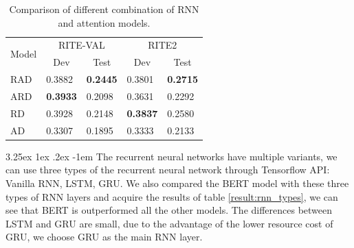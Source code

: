 \documentclass[12pt]{article}
\makeatletter
\renewcommand\paragraph{\@startsection{paragraph}{5}{\z@}%
  {3.25ex \@plus1ex \@minus.2ex}%
  {-1em}%
  {\normalfont\normalsize\bfseries}}
\makeatother
\begin{document}
\begin{CJK*}{UTF8}{bkai}
\begin{spacing}{1.77}
\begin{table}[H]
  \centering
  \setlength{\extrarowheight}{-3pt}
  \begin{tabular}{|l|l|l|l|l|}
  \hline
  \multicolumn{1}{|c|}{\multirow{2}{*}{Model}} & \multicolumn{2}{c|}{RITE-VAL} & \multicolumn{2}{c|}{RITE2} \\ \cline{2-5}
  \multicolumn{1}{|c|}{} & \multicolumn{1}{c|}{Dev} & \multicolumn{1}{c|}{Test} & \multicolumn{1}{c|}{Dev} & \multicolumn{1}{c|}{Test} \\ \hline
  RAD & 0.3882 & \textbf{0.2445} & 0.3801 & \textbf{0.2715} \\ \hline
  ARD & \textbf{0.3933} & 0.2098 & 0.3631 & 0.2292 \\ \hline
  RD & 0.3928 & 0.2148 & \textbf{0.3837} & 0.2580 \\ \hline
  AD & 0.3307 & 0.1895 & 0.3333 & 0.2133 \\ \hline
  \end{tabular}
  \caption{Comparison of different combination of RNN and attention models.}
  \label{result:nn_types_comparison}
\end{table}

\paragraph{}
The recurrent neural networks have multiple variants, we can use three types of the recurrent neural network through Tensorflow API: Vanilla RNN, LSTM, GRU. We also compared the BERT model with these three types of RNN layers and acquire the results of table \ref{result:rnn_types}, we can see that BERT is outperformed all the other models. The differences between LSTM and GRU are small, due to the advantage of the lower resource cost of GRU, we choose GRU as the main RNN layer.


\end{spacing}
\end{CJK*}
\end{document}

